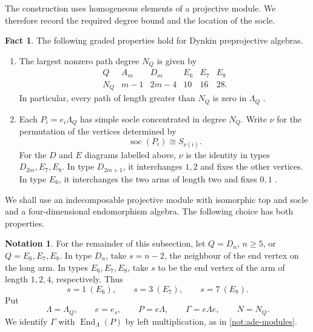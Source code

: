 \documentclass[a4paper,11pt,reqno]{amsart}
\theoremstyle{definition}
\newtheorem{notation}[notation]{Notation}
\newtheorem{fact}[fact]{Fact}
\theoremstyle{plain}
\numberwithin{equation}{section}
\newcommand{\End}{\operatorname{End}}
\begin{document}
The construction uses homogeneous elements of a projective module.
We therefore record the required degree bound and the location of
the socle.

\begin{fact}
\label{fact:ade-graded-structure}
The following graded properties hold for Dynkin preprojective
algebras.
\begin{enumerate}[label=\textup{(\roman*)},leftmargin=2.1em]
\item The largest nonzero path degree \(N_Q\) is given by
\[
\begin{array}{c|ccccc}
 Q&A_m&D_m&E_6&E_7&E_8\\\hline
 N_Q&m-1&2m-4&10&16&28.
\end{array}
\]
In particular, every path of length greater than \(N_Q\) is zero
in \(\Lambda_Q\)
\cite[Corollary~4.3]{BrennerButlerKing2002}.

\item Each \(P_i=e_i\Lambda_Q\) has simple socle concentrated
in degree \(N_Q\).  Write \(\nu\) for the permutation of the
vertices determined by
\[
 \operatorname{soc}(P_i)\cong S_{\nu(i)}.
\]
For the \(D\) and \(E\) diagrams labelled above, \(\nu\) is
the identity in types \(D_{2m},E_7,E_8\).  In type \(D_{2m+1}\),
it interchanges \(1,2\) and fixes the other vertices.  In type
\(E_6\), it interchanges the two arms of length two and fixes
\(0,1\)
\cite[Definition~4.6 and Theorem~4.8]{BrennerButlerKing2002}.
\end{enumerate}
\end{fact}

We shall use an indecomposable projective module with isomorphic
top and socle and a four-dimensional endomorphism algebra.
The following choice has both properties.

\begin{notation}
\label{not:ade-chosen-projective}
For the remainder of this subsection, let \(Q=D_n\), \(n\ge5\),
or \(Q=E_6,E_7,E_8\).  In type \(D_n\), take \(s=n-2\),
the neighbour of the end vertex on the long arm.  In types
\(E_6,E_7,E_8\), take \(s\) to be the end vertex of the arm of
length \(1,2,4\), respectively.  Thus
\[
 s=1\ (E_6),\qquad s=3\ (E_7),\qquad s=7\ (E_8).
\]
Put
\[
 \Lambda=\Lambda_Q,\qquad e=e_s,\qquad P=e\Lambda,
 \qquad\Gamma=e\Lambda e,\qquad N=N_Q.
\]
We identify \(\Gamma\) with \(\End_\Lambda(P)\) by left
multiplication, as in \cref{not:ade-modules}.
\end{notation}
\end{document}
